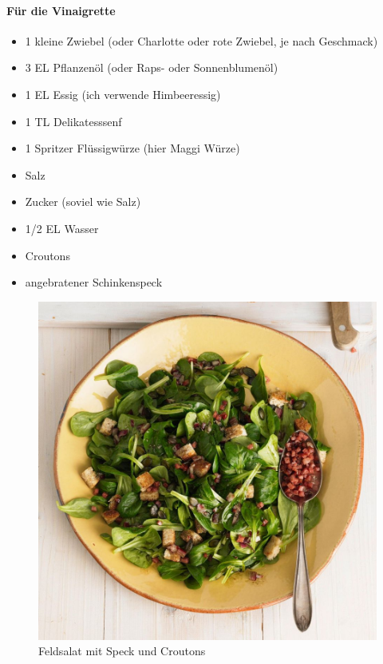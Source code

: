 \paragraph{Für die Vinaigrette}

\begin{itemize}[noitemsep]	
	\item 1 kleine Zwiebel  (oder Charlotte oder rote Zwiebel, je nach Geschmack)
	\item 3 EL Pflanzenöl (oder Raps- oder Sonnenblumenöl)
	\item 1 EL Essig (ich verwende Himbeeressig)
	\item 1 TL Delikatesssenf
	\item 1 Spritzer Flüssigwürze (hier Maggi Würze)
	\item Salz 
	\item Zucker (soviel wie Salz)
	\item 1/2 EL Wasser
	\item Croutons
	\item angebratener Schinkenspeck
\end{itemize}

\begin{figure}[h]
	\centering
	\includegraphics[scale=.35]{pics/Feldsalat}
	\caption{Feldsalat mit Speck und Croutons}
	\label{fig:Feldsalat}
\end{figure}

